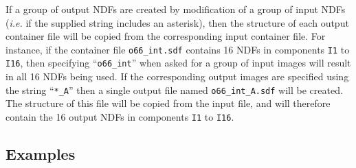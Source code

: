 \documentclass[twoside,11pt]{starlink}
\begin{document}
If a group of output NDFs are created by modification of a group of
input NDFs (\emph{i.e.} if the supplied string includes an asterisk), then
the structure of each output container file will be
copied from the corresponding input container file. For instance, if
the container file \verb+o66_int.sdf+ contains 16 NDFs in components
\verb+I1+ to \verb+I16+, then specifying ``\verb+o66_int+'' when asked
for a group of input images will result in all 16 NDFs being used.
If the corresponding output images are specified using the string
``\verb+*_A+'' then a single output file named \verb+o66_int_A.sdf+ will be created.
The structure of this file will be copied from the input file, and will
therefore contain the 16 output NDFs in components \verb+I1+ to \verb+I16+.




\subsection{Examples}
\end{document}
